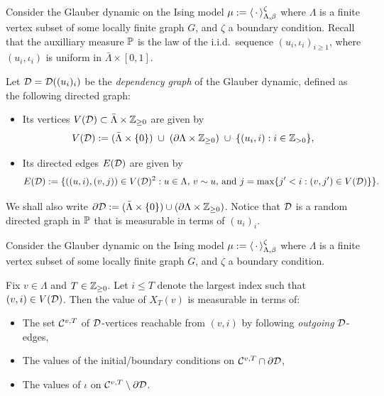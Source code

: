 \begin{definition}
    Consider the Glauber dynamic on the Ising model
    $\mu:=\langle\blank\rangle_{\Lambda,\beta}^\zeta$
    where $\Lambda$ is a finite vertex subset of some locally finite graph $G$,
    and $\zeta$ a boundary condition.
    Recall that the auxilliary measure $\P$ is the law of the i.i.d.~sequence
    $(u_i,\iota_i)_{i\geq 1}$,
    where $(u_i,\iota_i)$ is uniform in $\bar\Lambda\times[0,1]$.

    Let $\calD=\calD((u_i)_i)$ be the \emph{dependency graph} of the Glauber dynamic,
    defined as the following directed graph:
    \begin{itemize}
        \item Its vertices $V(\calD)\subset\bar\Lambda\times\Z_{\geq 0}$ are given by
            \begin{equation}
                V(\calD):=(\bar\Lambda\times\{0\})\;\cup\;(\partial\Lambda\times\Z_{\geq
                0})\;\cup\;\{(u_i,i):i\in\Z_{> 0}\},
            \end{equation}
        \item Its directed edges $E(\calD)$ are given by
            \begin{equation}
                E(\calD):=\{((u,i),(v,j))\in V(\calD)^2:\text{$u\in\Lambda$, $v\sim u$,
                and $j=\max\{j'<i:(v,j')\in V(\calD)$}\}\}.
            \end{equation}
    \end{itemize}
    We shall also write
    $\partial\calD:=(\bar\Lambda\times\{0\})\cup(\partial\Lambda\times\Z_{\geq 0})$.
    Notice that $\calD$ is a random directed graph in $\P$
    that is measurable in terms of $(u_i)_i$.
\end{definition}

\begin{lemma}
    Consider the Glauber dynamic on the Ising model
    $\mu:=\langle\blank\rangle_{\Lambda,\beta}^\zeta$
    where $\Lambda$ is a finite vertex subset of some locally finite graph $G$,
    and $\zeta$ a boundary condition.

    Fix $v\in\Lambda$ and $T\in\Z_{\geq 0}$.
    Let $i\leq T$ denote the largest index such that $(v,i)\in V(\calD)$.
    Then the value of $X_T(v)$ is measurable in terms of:
    \begin{itemize}
        \item The set $\calC^{v,T}$ of $\calD$-vertices reachable from $(v,i)$ by
            following \emph{outgoing} $\calD$-edges,
        \item The values of the initial/boundary conditions on $\calC^{v,T}\cap\partial\calD$,
        \item The values of $\iota$ on $\calC^{v,T}\setminus\partial\calD$.
    \end{itemize}
\end{lemma}

